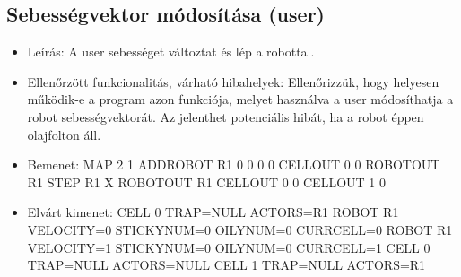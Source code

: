 \subsection{Sebességvektor módosítása (user)}
\begin{itemize}
	\item Leírás: \newline
 A user sebességet változtat és lép a robottal.

	\item Ellenőrzött funkcionalitás, várható hibahelyek: \newline
Ellenőrizzük, hogy helyesen működik-e a program azon funkciója, melyet használva a user módosíthatja a robot sebességvektorát. Az jelenthet potenciális hibát, ha a robot éppen olajfolton áll.

	\item Bemenet: \newline
MAP 2 1  \newline
ADDROBOT R1 0 0 0 0 \newline
CELLOUT 0 0 \newline
ROBOTOUT R1 \newline 
STEP R1 X \newline
ROBOTOUT R1 \newline
CELLOUT 0 0 \newline
CELLOUT 1 0

	
	\item Elvárt kimenet: \newline
CELL 0 TRAP=NULL ACTORS=R1 \newline
ROBOT R1 VELOCITY=0 STICKYNUM=0 OILYNUM=0 CURRCELL=0 \newline
ROBOT R1 VELOCITY=1 STICKYNUM=0 OILYNUM=0 CURRCELL=1 \newline
CELL 0 TRAP=NULL ACTORS=NULL \newline
CELL 1 TRAP=NULL ACTORS=R1 \newline

	
\end{itemize}

